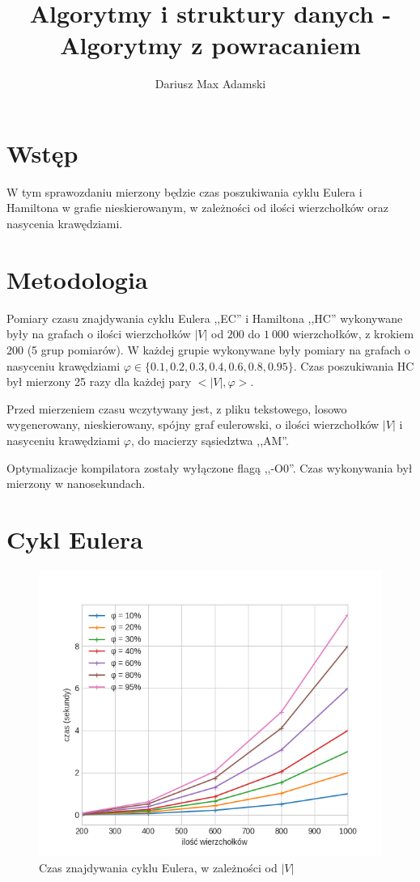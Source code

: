 \documentclass[11pt,twocolumn]{article}
\title{Algorytmy i struktury danych - Algorytmy z powracaniem}
\author{Dariusz Max Adamski}
\date{}
\begin{document}
\maketitle


\section*{Wstęp}

W tym sprawozdaniu mierzony będzie czas poszukiwania
cyklu Eulera i Hamiltona w grafie nieskierowanym,
w zależności od ilości wierzchołków oraz nasycenia krawędziami.


\section*{Metodologia}

Pomiary czasu znajdywania cyklu Eulera ,,EC'' i Hamiltona ,,HC'' wykonywane były na grafach
o ilości wierzchołków $|V|$ od $200$ do $1\ 000$ wierzchołków, z krokiem $200$ (5 grup pomiarów).
W każdej grupie wykonywane były pomiary na grafach o nasyceniu krawędziami
$\varphi \in \{0.1, 0.2, 0.3, 0.4, 0.6, 0.8, 0.95\}$.
Czas poszukiwania HC był mierzony 25 razy dla każdej pary $<|V|, \varphi>$.

Przed mierzeniem czasu wczytywany jest, z pliku tekstowego,
losowo wygenerowany, nieskierowany, spójny graf eulerowski,
o ilości wierzchołków $|V|$  i nasyceniu krawędziami $\varphi$,
do macierzy sąsiedztwa ,,AM''.

Optymalizacje kompilatora zostały wyłączone flagą ,,-O0''. 
Czas wykonywania był mierzony w nanosekundach.


\section{Cykl Eulera}

\begin{figure}[h]
	\includegraphics[width=\linewidth]{euler.png}
	\caption{Czas znajdywania cyklu Eulera, w zależności od $|V|$ \label{euler}}
\end{figure}
\end{document}
